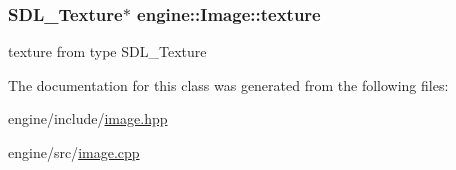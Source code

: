 \subsubsection[{\texorpdfstring{texture}{texture}}]{\setlength{\rightskip}{0pt plus 5cm}S\+D\+L\+\_\+\+Texture$\ast$ engine\+::\+Image\+::texture}\hypertarget{classengine_1_1_image_a1aba43ce4fe48d3c18e4db97543c1077}{}\label{classengine_1_1_image_a1aba43ce4fe48d3c18e4db97543c1077}
texture from type S\+D\+L\+\_\+\+Texture 

The documentation for this class was generated from the following files\+:\begin{DoxyCompactItemize}
\item 
engine/include/\hyperlink{image_8hpp}{image.\+hpp}\item 
engine/src/\hyperlink{image_8cpp}{image.\+cpp}\end{DoxyCompactItemize}
